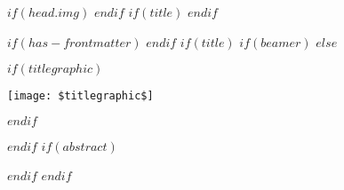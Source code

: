\pagestyle{fancy}
\fancyhead{} %
\renewcommand{\headrulewidth}{0pt}
$if(head.img)$
$endif$
$if(title)$
$endif$
\sectionfont{\color{odapred}\sectionrule{3ex}{0pt}{-1ex}{0.5pt}} %

\makeatletter
\def\@maketitle{%
  \newpage
  \null
  \vskip 2em%
  \begin{center}%
  \let \footnote \thanks
    {\LARGE \@title \par}%
    \vskip 1em%
	$if(version)$
    {\Large Version $version$\par}%
	$endif$
    \vskip 1.5em%
    {\large
      \lineskip .5em%
      \begin{tabular}[t]{c}%
        \@author
      \end{tabular}\par}%
    \vskip 1em%
    {\large \@date}%
  \end{center}%
  \par
  \vskip 1.5em}
\makeatother

$if(has-frontmatter)$
\frontmatter
$endif$
$if(title)$
$if(beamer)$
\frame{\titlepage}
$else$

{\color{odapred}\maketitle}
\vspace{0.5cm}
$if(titlegraphic)$
\centerline{\texttt{[image: \$titlegraphic\$]}}
\vspace{2cm}
$endif$

$endif$
$if(abstract)$
\begin{abstract}
$abstract$
\end{abstract}
$endif$
$endif$
